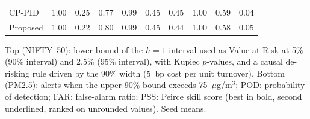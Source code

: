 \begin{table}[!t]
\begin{tabular}{lccccccccc}
CP-PID & 1.00 & 0.25 & 0.77 & 0.99 & 0.45 & 0.45 & 1.00 & 0.59 & 0.04\\
Proposed & 1.00 & 0.22 & 0.80 & 0.99 & 0.45 & 0.44 & 1.00 & 0.58 & 0.05\\
\bottomrule\end{tabular}
\par\smallskip\parbox{\linewidth}{\scriptsize Top (NIFTY~50): lower bound of the $h=1$ interval used as Value-at-Risk at 5\% (90\% interval) and 2.5\% (95\% interval), with Kupiec $p$-values, and a causal de-risking rule driven by the 90\% width (5~bp cost per unit turnover). Bottom (PM2.5): alerts when the upper 90\% bound exceeds 75~$\mu$g/m$^3$; POD: probability of detection; FAR: false-alarm ratio; PSS: Peirce skill score (best in bold, second underlined, ranked on unrounded values). Seed means.}
\end{table}